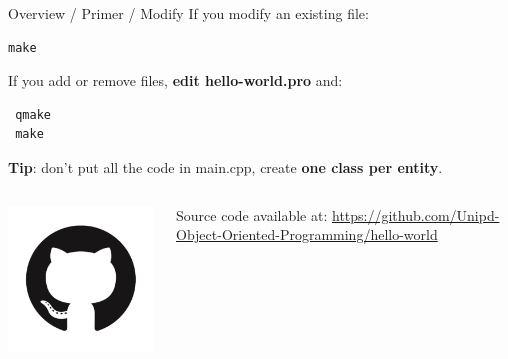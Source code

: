 \documentclass[11pt]{beamer}
\renewcommand{\emph}[1]{\textbf{#1}}
\begin{document}
\begin{frame}[fragile]{Overview / Primer / Modify}
 If you modify an existing file:
 \begin{lstlisting}
make
\end{lstlisting}

If you add or remove files, \emph{edit hello-world.pro} and:
 \begin{lstlisting}
 qmake
 make
\end{lstlisting}

 \emph{Tip}: don't put all the code in main.cpp, create \emph{one class per entity}.
 
 \begin{columns}
  \begin{column}{0.15\textwidth}
   \includegraphics[width=0.99\textwidth]{assets/logo-github}
  \end{column}
  \begin{column}{0.85\textwidth}
   Source code available at:
   \url{https://github.com/Unipd-Object-Oriented-Programming/hello-world}
  \end{column}
 \end{columns}
\end{frame}


\end{document}
